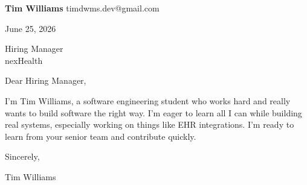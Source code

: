 \documentclass[12pt]{article}
\begin{document}
\textbf{Tim Williams} \hfill timdwms.dev@gmail.com

\vspace{1em}

June 25, 2026

\vspace{1em}

Hiring Manager \\
nexHealth

\vspace{1em}

Dear Hiring Manager,

I'm Tim Williams, a software engineering student who works hard and really wants to build software the right way. I'm eager to learn all I can while building real systems, especially working on things like EHR integrations. I'm ready to learn from your senior team and contribute quickly.

\vspace{1em}

Sincerely,

\vspace{2em}

Tim Williams
\end{document}
